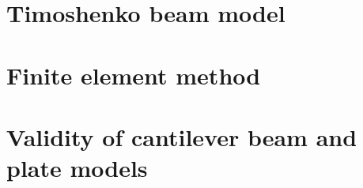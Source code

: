 \documentclass[12pt]{report}
\begin{document}
\chapter{Timoshenko beam model}\label{ch:timoshenko-beam-model}







\chapter{Finite element method}\label{ch:finite-element-method}




\chapter{Validity of cantilever beam and plate models}\label{ch:validity-of-cantilever-beam-and-plate-models}






% 
% 
% 

% 

\printbibliography

% 
% 
\end{document}

